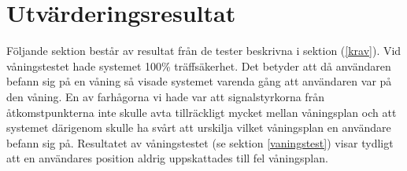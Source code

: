 \documentclass[a4paper,12pt]{article}
\begin{document}

 \section{Utvärderingsresultat}\label{utvarderingsresultat}

 Följande sektion består av resultat från de tester beskrivna i sektion (\ref{krav}). Vid våningstestet hade systemet 100\% träffsäkerhet. Det betyder att då användaren befann sig på en våning så visade systemet varenda gång att användaren var på den våning. En av farhågorna vi hade var att signalstyrkorna från åtkomstpunkterna inte skulle avta tillräckligt mycket mellan våningsplan och att systemet därigenom skulle ha svårt att urskilja vilket våningsplan en användare befann sig på. Resultatet av våningstestet (se sektion \ref{vaningstest}) visar tydligt att en användares position aldrig uppskattades till fel våningsplan.
\end{document}
